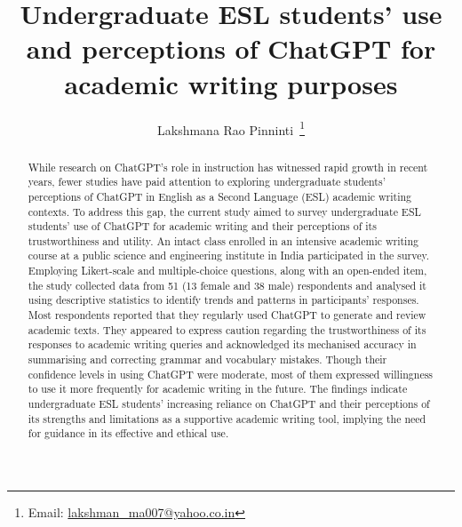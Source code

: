 \documentclass[english]{textolivre}
\title{Undergraduate ESL students' use and perceptions of ChatGPT for academic writing purposes}
\author[1]{Lakshmana Rao Pinninti~\orcid{0000-0003-0300-6339}\thanks{Email: \href{mailto:lakshman_ma007@yahoo.co.in}{lakshman\_ma007@yahoo.co.in}}}
\affil[1]{Indian Institute of Technology Kanpur, Department of Humanities and Social Sciences, Kanpur, India.}
\begin{document}
\maketitle

\begin{polyabstract}
\begin{abstract}
While research on ChatGPT’s role in instruction has witnessed rapid growth in recent years, fewer studies have paid attention to exploring undergraduate students’ perceptions of ChatGPT in English as a Second Language (ESL) academic writing contexts. To address this gap, the current study aimed to survey undergraduate ESL students’ use of ChatGPT for academic writing and their perceptions of its trustworthiness and utility. An intact class enrolled in an intensive academic writing course at a public science and engineering institute in India participated in the survey. Employing Likert-scale and multiple-choice questions, along with an open-ended item, the study collected data from 51 (13 female and 38 male) respondents and analysed it using descriptive statistics to identify trends and patterns in participants’ responses. Most respondents reported that they regularly used ChatGPT to generate and review academic texts. They appeared to express caution regarding the trustworthiness of its responses to academic writing queries and acknowledged its mechanised accuracy in summarising and correcting grammar and vocabulary mistakes. Though their confidence levels in using ChatGPT were moderate, most of them expressed willingness to use it more frequently for academic writing in the future. The findings indicate undergraduate ESL students’ increasing reliance on ChatGPT and their perceptions of its strengths and limitations as a supportive academic writing tool, implying the need for guidance in its effective and ethical use.

\end{abstract}


\end{polyabstract}
\end{document}
